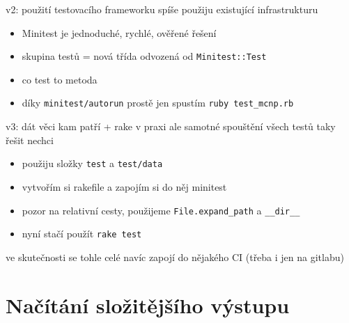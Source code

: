 \documentclass{beamer}
\begin{document}
\begin{frame}{v2: použití testovacího frameworku}
  spíše použiju existující infrastrukturu
  \begin{itemize}
    \item Minitest je jednoduché, rychlé, ověřené řešení
    \item skupina testů = nová třída odvozená od \texttt{Minitest::Test}  
    \item co test to metoda
    \item díky \texttt{minitest/autorun} prostě jen spustím \texttt{ruby test\_mcnp.rb}
  \end{itemize}
\end{frame}

\begin{frame}{v3: dát věci kam patří + rake}
  v praxi ale samotné spouštění všech testů taky řešit nechci
  \begin{itemize}
    \item použiju složky \texttt{test} a \texttt{test/data}
    \item vytvořím si rakefile a zapojím si do něj minitest
    \item pozor na relativní cesty, použijeme \texttt{File.expand\_path} a \texttt{\_\_dir\_\_}
    \item nyní stačí použít \texttt{rake test}
  \end{itemize}
  ve skutečnosti se tohle celé navíc zapojí do nějakého CI (třeba i jen na gitlabu)
\end{frame}

\section{Načítání složitějšího výstupu}
\end{document}

